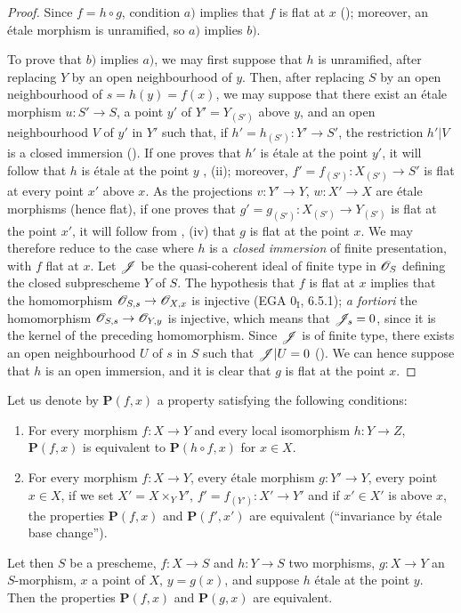 \begin{proof}
Since $f=h\circ g$, condition $a)$ implies that $f$ is flat at $x$ (); moreover, an \'etale morphism is unramified, so $a)$ implies $b)$.

To prove that $b)$ implies $a)$, we may first suppose that $h$ is unramified, after replacing $Y$ by an open neighbourhood of $y$.
Then, after replacing $S$ by an open neighbourhood of $s=h(y)=f(x)$, we may suppose that there exist an \'etale morphism $u:S'\to S$, a point $y'$ of $Y'=Y_{(S')}$ above $y$, and an open neighbourhood $V$ of $y'$ in $Y'$ such that, if $h'=h_{(S')}:Y'\to S'$, the restriction $h'|V$ is a closed immersion ().
If one proves that $h'$ is \'etale at the point $y'$, it will follow that $h$ is \'etale at the point $y$ , (ii);
moreover, $f'=f_{(S')}:X_{(S')}\to S'$ is flat at every point $x'$ above $x$.
As the projections $v:Y'\to Y$, $w:X'\to X$ are \'etale morphisms (hence flat), if one proves that $g'=g_{(S')}:X_{(S')}\to Y_{(S')}$ is flat at the point $x'$, it will follow from , (iv) that $g$ is flat at the point $x$.
We may therefore reduce to the case where $h$ is a \emph{closed immersion}
of finite presentation, with $f$ flat at $x$.
Let $\mathscr{J}$ be the quasi-coherent ideal of finite type in $\mathscr{O}_S$ defining the closed subprescheme $Y$ of $S$.
The hypothesis that $f$ is flat at $x$ implies that the homomorphism $\mathscr{O}_{S,s}\to\mathscr{O}_{X,x}$ is injective (EGA $0_{\mathrm{I}}$, 6.5.1);
\emph{a fortiori} the homomorphism $\mathscr{O}_{S,s}\to\mathscr{O}_{Y,y}$ is injective, which means that $\mathscr{J}_s=0$, since it is the kernel of the preceding homomorphism.
Since $\mathscr{J}$ is of finite type, there exists an open neighbourhood $U$ of $s$ in $S$ such that $\mathscr{J}|U=0$ ().
We can hence suppose that $h$ is an open immersion, and it is clear that $g$ is flat at the point $x$.
\end{proof}

\begin{proposition}[18.4.10]
\label{IV.18.4.10}
Let us denote by $\mathbf{P}(f,x)$ a property satisfying the following conditions:
\begin{enumerate}
  \item[$1^\circ$] For every morphism $f:X\to Y$ and every local isomorphism $h:Y\to Z$, $\mathbf{P}(f,x)$ is equivalent to $\mathbf{P}(h\circ f,x)$ for $x\in X$.
  \item[$2^\circ$] For every morphism $f:X\to Y$, every \'etale morphism $g:Y'\to Y$, every point $x\in X$, if we set $X'=X\times_Y Y'$, $f'=f_{(Y')}:X'\to Y'$ and if $x'\in X'$ is above $x$, the properties $\mathbf{P}(f,x)$ and $\mathbf{P}(f',x')$ are equivalent (``invariance by \'etale base change'').
\end{enumerate}
Let then $S$ be a prescheme, $f:X\to S$ and $h:Y\to S$ two morphisms, $g:X\to Y$ an $S$-morphism, $x$ a point of $X$, $y=g(x)$, and suppose $h$ \'etale at the point $y$.
Then the properties $\mathbf{P}(f,x)$ and $\mathbf{P}(g,x)$ are equivalent.
\end{proposition}


